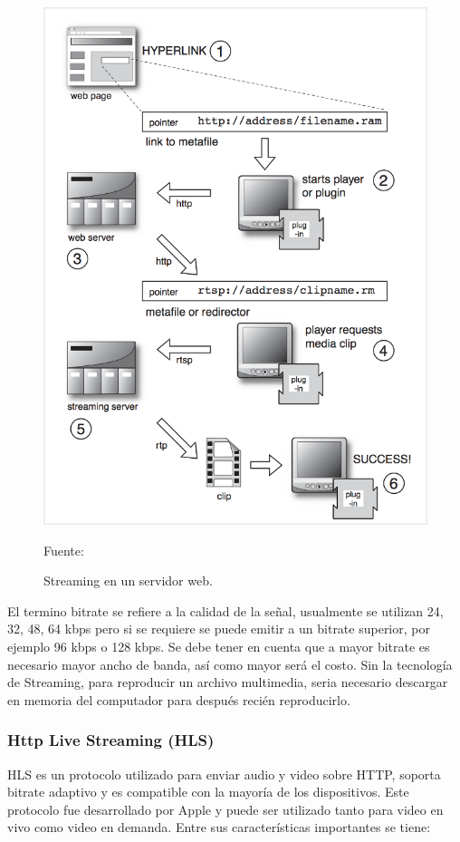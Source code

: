 \begin{figure}[H]
    \begin{center}
        \includegraphics[width=12cm]{img/capitulo_2/streamming.png}
        \caption{Streaming en un servidor web.\\}
        Fuente: \cite{streamming:austerberry}
        \label{fig:streamming}
    \end{center}
\end{figure}

El termino bitrate se refiere a la calidad de la señal, usualmente se utilizan 24, 32, 48, 64 kbps pero si se requiere se puede emitir a un bitrate superior, por ejemplo 96 kbps o 128 kbps. Se debe tener en cuenta que a mayor bitrate es necesario mayor ancho de banda, así como mayor será el costo. Sin la tecnología de Streaming, para reproducir un archivo multimedia, seria necesario descargar en memoria del computador para después recién reproducirlo.\\

\subsubsection{Http Live Streaming (HLS)}
HLS es un protocolo utilizado para enviar audio y video sobre HTTP, soporta bitrate adaptivo y es compatible con la mayoría de los dispositivos. Este protocolo fue desarrollado por Apple y puede ser utilizado tanto para video en vivo como video en demanda. Entre sus características importantes se tiene:

